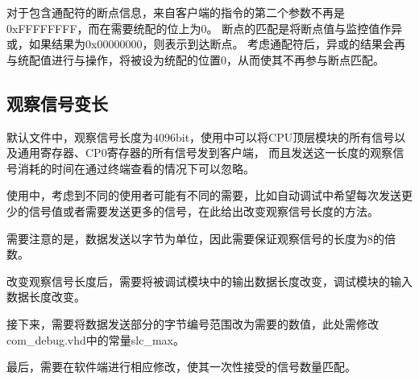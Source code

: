         对于包含通配符的断点信息，来自客户端的指令的第二个参数不再是0xFFFFFFFF，而在需要统配的位上为0。%
        断点的匹配是将断点值与监控值作异或，如果结果为0x00000000，则表示到达断点。%
        考虑通配符后，异或的结果会再与统配值进行与操作，将被设为统配的位置0，从而使其不再参与断点匹配。

    \subsection{观察信号变长}
        默认文件中，观察信号长度为4096bit，使用中可以将CPU顶层模块的所有信号以及通用寄存器、CP0寄存器的所有信号发到客户端，
        而且发送这一长度的观察信号消耗的时间在通过终端查看的情况下可以忽略。

        使用中，考虑到不同的使用者可能有不同的需要，比如自动调试中希望每次发送更少的信号值或者需要发送更多的信号，在此给出改变观察信号长度的方法。

        需要注意的是，数据发送以字节为单位，因此需要保证观察信号的长度为8的倍数。

        改变观察信号长度后，需要将被调试模块中的输出数据长度改变，调试模块的输入数据长度改变。

        接下来，需要将数据发送部分的字节编号范围改为需要的数值，此处需修改com\_debug.vhd中的常量slc\_max。

        最后，需要在软件端进行相应修改，使其一次性接受的信号数量匹配。
